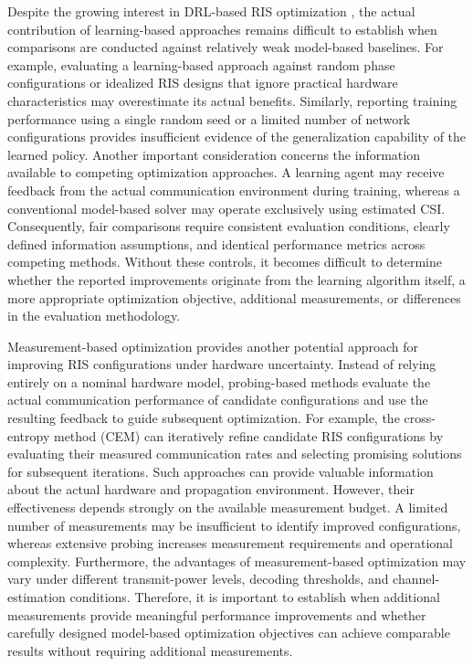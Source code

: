 \documentclass[journal]{IEEEtran}
\begin{document}
Despite the growing interest in DRL-based RIS optimization \cite{saglam2022drl}, the actual contribution of learning-based approaches remains difficult to establish when comparisons are conducted against relatively weak model-based baselines. For example, evaluating a learning-based approach against random phase configurations or idealized RIS designs that ignore practical hardware characteristics may overestimate its actual benefits. Similarly, reporting training performance using a single random seed or a limited number of network configurations provides insufficient evidence of the generalization capability of the learned policy. Another important consideration concerns the information available to competing optimization approaches. A learning agent may receive feedback from the actual communication environment during training, whereas a conventional model-based solver may operate exclusively using estimated CSI. Consequently, fair comparisons require consistent evaluation conditions, clearly defined information assumptions, and identical performance metrics across competing methods. Without these controls, it becomes difficult to determine whether the reported improvements originate from the learning algorithm itself, a more appropriate optimization objective, additional measurements, or differences in the evaluation methodology.

Measurement-based optimization provides another potential approach for improving RIS configurations under hardware uncertainty. Instead of relying entirely on a nominal hardware model, probing-based methods evaluate the actual communication performance of candidate configurations and use the resulting feedback to guide subsequent optimization. For example, the cross-entropy method (CEM) can iteratively refine candidate RIS configurations by evaluating their measured communication rates and selecting promising solutions for subsequent iterations. Such approaches can provide valuable information about the actual hardware and propagation environment. However, their effectiveness depends strongly on the available measurement budget. A limited number of measurements may be insufficient to identify improved configurations, whereas extensive probing increases measurement requirements and operational complexity. Furthermore, the advantages of measurement-based optimization may vary under different transmit-power levels, decoding thresholds, and channel-estimation conditions. Therefore, it is important to establish when additional measurements provide meaningful performance improvements and whether carefully designed model-based optimization objectives can achieve comparable results without requiring additional measurements.
\end{document}
